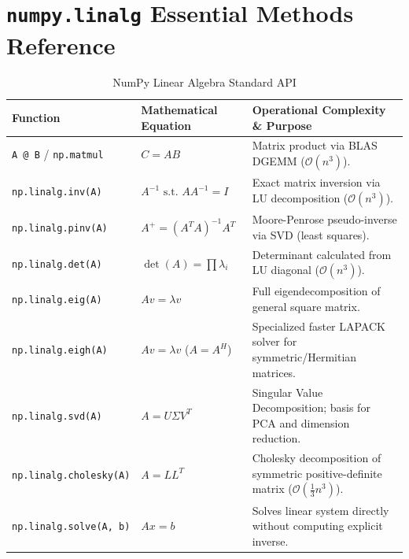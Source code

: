 \section{\texttt{numpy.linalg} Essential Methods Reference}
\begin{table}[htbp]
\centering
\small
\begin{tabularx}{\linewidth}{llX}
\toprule
\textbf{Function} & \textbf{Mathematical Equation} & \textbf{Operational Complexity \& Purpose} \\
\midrule
\texttt{A @ B} / \texttt{np.matmul} & $C = A B$ & Matrix product via BLAS DGEMM ($\mathcal{O}(n^3)$). \\
\texttt{np.linalg.inv(A)} & $A^{-1} \text{ s.t. } A A^{-1} = I$ & Exact matrix inversion via LU decomposition ($\mathcal{O}(n^3)$). \\
\texttt{np.linalg.pinv(A)} & $A^+ = (A^T A)^{-1} A^T$ & Moore-Penrose pseudo-inverse via SVD (least squares). \\
\texttt{np.linalg.det(A)} & $\det(A) = \prod \lambda_i$ & Determinant calculated from LU diagonal ($\mathcal{O}(n^3)$). \\
\texttt{np.linalg.eig(A)} & $A v = \lambda v$ & Full eigendecomposition of general square matrix. \\
\texttt{np.linalg.eigh(A)} & $A v = \lambda v$ ($A = A^H$) & Specialized faster LAPACK solver for symmetric/Hermitian matrices. \\
\texttt{np.linalg.svd(A)} & $A = U \Sigma V^T$ & Singular Value Decomposition; basis for PCA and dimension reduction. \\
\texttt{np.linalg.cholesky(A)} & $A = L L^T$ & Cholesky decomposition of symmetric positive-definite matrix ($\mathcal{O}(\frac{1}{3}n^3)$). \\
\texttt{np.linalg.solve(A, b)} & $A x = b$ & Solves linear system directly without computing explicit inverse. \\
\bottomrule
\end{tabularx}
\caption{NumPy Linear Algebra Standard API}
\end{table}
